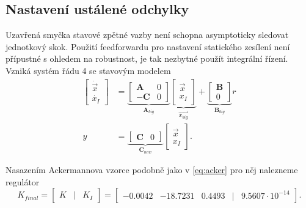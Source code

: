 \documentclass[twoside]{article}
\begin{document}
\subsection{Nastavení ustálené odchylky}
Uzavřená smyčka stavové zpětné vazby není schopna asymptoticky sledovat jednotkový skok. Použití feedforwardu pro nastavení
statického zesílení není přípustné s ohledem na robustnost, je tak nezbytné použít integrální řízení.
Vzniká systém řádu 4 se stavovým modelem
\begin{equation}
	\begin{split}
		\begin{bmatrix}
			\dot{\vec{x}} \\ \dot{x_I}
		\end{bmatrix} &= \underbrace{ \begin{bmatrix}
			\mathbf{A} & 0 \\
			-\mathbf{C} & 0
		\end{bmatrix}}_{\mathbf{A}_{big}} \underbrace{ \begin{bmatrix}
			\vec{x} \\ x_I
		\end{bmatrix}}_{\vec{x_{big}}} + \underbrace{\begin{bmatrix}
			\mathbf{B} \\ 0
		\end{bmatrix}}_{\mathbf{B}_{big}} r \\
		y &= \underbrace{\begin{bmatrix}
			\mathbf{C} & 0
		\end{bmatrix}}_{\mathbf{C}_{new}} \begin{bmatrix}
			\vec{x} \\ x_I
		\end{bmatrix}.
	\end{split}
\end{equation}

Nasazením Ackermannova vzorce podobně jako v \eqref{eq:acker} pro něj nalezneme regulátor
\begin{equation}
	K_{final} = \begin{bmatrix}
		K & \mid & K_I
	\end{bmatrix} = \begin{bmatrix}
		-0.0042 &  -18.7231 &   0.4493 & \mid &  9.5607 \cdot 10^{-14}
	\end{bmatrix}.
\end{equation}
\end{document}
